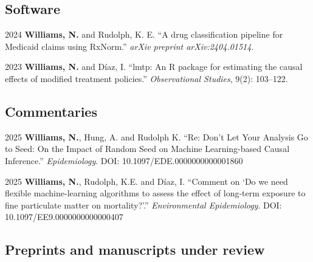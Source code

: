 \documentclass[12pt,letterpaper]{report}
\begin{document}
    \subsection*{Software}
    
    \begin{tablist}
    
    \item[2024] \tab \textbf{Williams, N.} and Rudolph, K. E. \enquote{A drug classification pipeline for Medicaid claims using RxNorm.} \textit{arXiv preprint arXiv:2404.01514}.
    
    \item[2023] \tab \textbf{Williams, N.} and Díaz, I. \enquote{lmtp: An R package for estimating the causal effects of modified treatment policies.} \textit{Observational Studies}, 9(2): 103--122.
    
    \end{tablist}
    
    \subsection*{Commentaries}
    
    \begin{tablist}
    
       \item[2025] \tab \textbf{Williams, N.}, Hung, A. and Rudolph K. \enquote{Re: Don’t Let Your Analysis Go to Seed: On the Impact of Random Seed on Machine Learning-based Causal Inference.} \textit{Epidemiology}. DOI: 10.1097/EDE.0000000000001860
   
   	\item[2025]\tab \textbf{Williams, N.}, Rudolph, K.E. and Díaz, I. \enquote{Comment on `Do we need flexible machine-learning algorithms to assess the effect of long-term exposure to fine particulate matter on mortality?'.} \textit{Environmental Epidemiology}. DOI: 10.1097/EE9.0000000000000407
    
    \end{tablist}
    
    \subsection*{Preprints and manuscripts under review}
    
\end{document}
